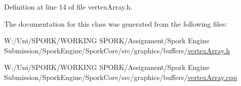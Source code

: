 Definition at line 14 of file vertex\+Array.\+h.



The documentation for this class was generated from the following files\+:\begin{DoxyCompactItemize}
\item 
W\+:/\+Uni/\+S\+P\+O\+R\+K/\+W\+O\+R\+K\+I\+N\+G S\+P\+O\+R\+K/\+Assignment/\+Spork Engine Submission/\+Spork\+Engine/\+Spork\+Core/src/graphics/buffers/\hyperlink{vertex_array_8h}{vertex\+Array.\+h}\item 
W\+:/\+Uni/\+S\+P\+O\+R\+K/\+W\+O\+R\+K\+I\+N\+G S\+P\+O\+R\+K/\+Assignment/\+Spork Engine Submission/\+Spork\+Engine/\+Spork\+Core/src/graphics/buffers/\hyperlink{vertex_array_8cpp}{vertex\+Array.\+cpp}\end{DoxyCompactItemize}

